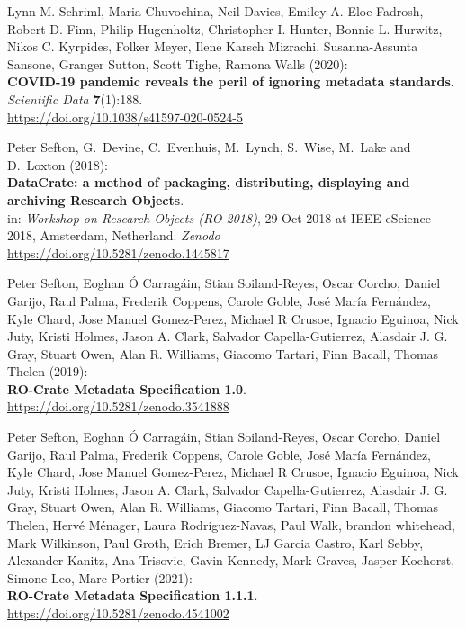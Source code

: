 \begin{thebibliography}{9}
Lynn M. Schriml, Maria Chuvochina, Neil Davies, Emiley A.
Eloe-Fadrosh, Robert D. Finn, Philip Hugenholtz, Christopher I. Hunter,
Bonnie L. Hurwitz, Nikos C. Kyrpides, Folker Meyer, Ilene Karsch
Mizrachi, Susanna-Assunta Sansone, Granger Sutton, Scott Tighe, Ramona
Walls (2020):\\
\textbf{COVID-19 pandemic reveals the peril of ignoring metadata
standards}.\\
\emph{Scientific Data} \textbf{7}(1):188.\\
\url{https://doi.org/10.1038/s41597-020-0524-5}

Peter Sefton, G.~Devine, C.~Evenhuis, M.~Lynch, S.~Wise,
M.~Lake and D.~Loxton (2018):\\
\textbf{DataCrate: a method of packaging, distributing, displaying and
archiving Research Objects}.\\
in: \emph{Workshop on Research Objects (RO 2018)}, 29 Oct 2018 at IEEE
eScience 2018, Amsterdam, Netherland. \emph{Zenodo}\\
\url{https://doi.org/10.5281/zenodo.1445817}


Peter Sefton, Eoghan Ó Carragáin, Stian Soiland-Reyes, Oscar
Corcho, Daniel Garijo, Raul Palma, Frederik Coppens, Carole Goble, José
María Fernández, Kyle Chard, Jose Manuel Gomez-Perez, Michael R Crusoe,
Ignacio Eguinoa, Nick Juty, Kristi Holmes, Jason A. Clark, Salvador
Capella-Gutierrez, Alasdair J. G. Gray, Stuart Owen, Alan R. Williams,
Giacomo Tartari, Finn Bacall, Thomas Thelen (2019):\\
\textbf{RO-Crate Metadata Specification 1.0}.\\
\url{https://doi.org/10.5281/zenodo.3541888}

Peter Sefton, Eoghan Ó Carragáin, Stian Soiland-Reyes, Oscar
Corcho, Daniel Garijo, Raul Palma, Frederik Coppens, Carole Goble, José
María Fernández, Kyle Chard, Jose Manuel Gomez-Perez, Michael R Crusoe,
Ignacio Eguinoa, Nick Juty, Kristi Holmes, Jason A. Clark, Salvador
Capella-Gutierrez, Alasdair J. G. Gray, Stuart Owen, Alan R. Williams,
Giacomo Tartari, Finn Bacall, Thomas Thelen, Hervé Ménager, Laura
Rodríguez-Navas, Paul Walk, brandon whitehead, Mark Wilkinson, Paul
Groth, Erich Bremer, LJ Garcia Castro, Karl Sebby, Alexander Kanitz, Ana
Trisovic, Gavin Kennedy, Mark Graves, Jasper Koehorst, Simone Leo, Marc
Portier (2021):\\
\textbf{RO-Crate Metadata Specification 1.1.1}.\\
\url{https://doi.org/10.5281/zenodo.4541002}


\end{thebibliography}
